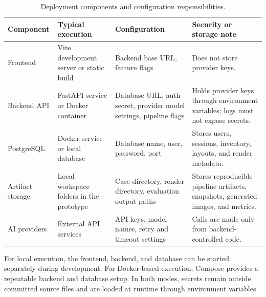 \begingroup
\small
\setlength{\tabcolsep}{4pt}
\renewcommand{\arraystretch}{1.15}
\begin{xltabular}{\textwidth}{|>{\raggedright\arraybackslash}p{2.6cm}|>{\raggedright\arraybackslash}p{2.4cm}|>{\raggedright\arraybackslash}X|>{\raggedright\arraybackslash}X|}
\caption{Deployment components and configuration responsibilities.}\label{tab:6-4}\\
\hline
\textbf{Component} & \textbf{Typical execution} & \textbf{Configuration} & \textbf{Security or storage note} \\
\hline
Frontend & Vite development server or static build & Backend base URL, feature flags & Does not store provider keys. \\
\hline
Backend API & FastAPI service or Docker container & Database URL, auth secret, provider model settings, pipeline flags & Holds provider keys through environment variables; logs must not expose secrets. \\
\hline
PostgreSQL & Docker service or local database & Database name, user, password, port & Stores users, sessions, inventory, layouts, and render metadata. \\
\hline
Artifact storage & Local workspace folders in the prototype & Case directory, render directory, evaluation output paths & Stores reproducible pipeline artifacts, snapshots, generated images, and metrics. \\
\hline
AI providers & External API services & API keys, model names, retry and timeout settings & Calls are made only from backend-controlled code. \\
\hline
\end{xltabular}
\endgroup

For local execution, the frontend, backend, and database can be started separately during development. For Docker-based execution, Compose provides a repeatable backend and database setup. In both modes, secrets remain outside committed source files and are loaded at runtime through environment variables.
